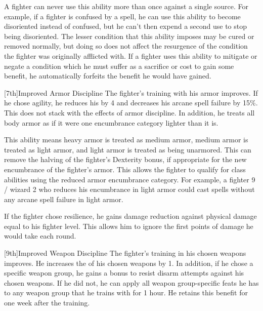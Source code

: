         \par A fighter can never use this ability more than once against a single source.
        For example, if a fighter is confused by a  spell, he can use this ability to become disoriented instead of confused, but he can't then expend a second use to stop being disoriented.
        The lesser condition that this ability imposes may be cured or removed normally, but doing so does not affect the resurgence of the condition the fighter was originally afflicted with.
        If a fighter uses this ability to mitigate or negate a condition which he must suffer as a sacrifice or cost to gain some benefit, he automatically forfeits the benefit he would have gained.

        [7th]{Improved Armor Discipline}
        The fighter's training with his armor improves.
        If he chose agility, he reduces his  by 4 and decreases his arcane spell failure by 15\%.
        This does not stack with the effects of armor discipline.
        In addition, he treats all body armor as if it were one encumbrance category lighter than it is.
        \par This ability means heavy armor is treated as medium armor, medium armor is treated as light armor, and light armor is treated as being unarmored.
        This can remove the halving of the fighter's Dexterity bonus, if appropriate for the new encumbrance of the fighter's armor.
        This allows the fighter to qualify for class abilities using the reduced armor encumbrance category.
        For example, a fighter 9 / wizard 2 who reduces his encumbrance in light armor could cast spells without any arcane spell failure in light armor.

        If the fighter chose resilience, he gains damage reduction against physical damage equal to his fighter level. This allows him to ignore the first points of damage he would take each round.

        [9th]{Improved Weapon Discipline}
        The fighter's training in his chosen weapons improves.
        He increases the  of his chosen weapons by 1.
        In addition, if he chose a specific weapon group, he gains a  bonus to resist disarm attempts against his chosen weapons.
        If he did not, he can apply all weapon group-specific feats he has to any weapon group that he trains with for 1 hour.
        He retains this benefit for one week after the training.

